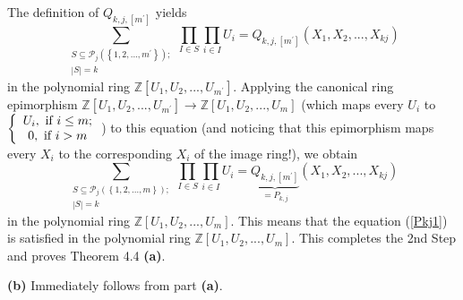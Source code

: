 \documentclass[12pt,final,notitlepage,onecolumn,german]{article}%
\begin{document}
The definition of $Q_{k,j,\left[  m^{\prime}\right]  }$ yields
\[
\sum_{\substack{S\subseteq\mathcal{P}_{j}\left(  \left\{  1,2,...,m^{\prime
}\right\}  \right)  ;\\\left\vert S\right\vert =k}}\prod_{I\in S}\prod_{i\in
I}U_{i}=Q_{k,j,\left[  m^{\prime}\right]  }\left(  X_{1},X_{2},...,X_{kj}%
\right)
\]
in the polynomial ring $\mathbb{Z}\left[  U_{1},U_{2},...,U_{m^{\prime}%
}\right]  $. Applying the canonical ring epimorphism $\mathbb{Z}\left[
U_{1},U_{2},...,U_{m^{\prime}}\right]  \rightarrow\mathbb{Z}\left[
U_{1},U_{2},...,U_{m}\right]  $ (which maps every $U_{i}$ to $\left\{
\begin{array}
[c]{c}%
U_{i},\text{ if }i\leq m;\\
0,\text{ if }i>m
\end{array}
\right.  $) to this equation (and noticing that this epimorphism maps every
$X_{i}$ to the corresponding $X_{i}$ of the image ring!), we obtain%
\[
\sum_{\substack{S\subseteq\mathcal{P}_{j}\left(  \left\{  1,2,...,m\right\}
\right)  ;\\\left\vert S\right\vert =k}}\prod_{I\in S}\prod_{i\in I}%
U_{i}=\underbrace{Q_{k,j,\left[  m^{\prime}\right]  }}_{=P_{k,j}}\left(
X_{1},X_{2},...,X_{kj}\right)
\]
in the polynomial ring $\mathbb{Z}\left[  U_{1},U_{2},...,U_{m}\right]  .$
This means that the equation (\ref{Pkj1}) is satisfied in the polynomial ring
$\mathbb{Z}\left[  U_{1},U_{2},...,U_{m}\right]  .$ This completes the 2nd
Step and proves Theorem 4.4 \textbf{(a)}.

\textbf{(b)} Immediately follows from part \textbf{(a)}.
\end{document}
